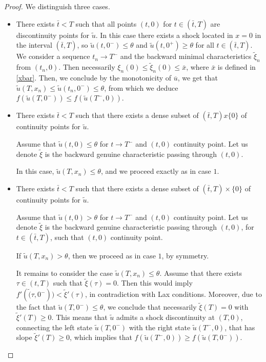 \documentclass[a4paper, 10pt, final]{article}
\begin{document}
\begin{proof}
 
We distinguish three cases.
\begin{itemize}
\item[(i)] There exists $\bar t<T$ such that all points $(t,0)$ for $t\in (\bar t, T)$ 
are discontinuity points for $\widetilde u$. In this case there exists a shock located in $x=0$ in the interval 
$(\bar t, T)$, so $\widetilde u(t, 0^-)\leq \theta$ and $\widetilde u(t, 0^+)\geq \theta$ for all $t\in  (\bar t, T)$. 
We consider a sequence $t_n\to T^-$ and the backward minimal characteristics $\widetilde \xi_n$ from $(t_n, 0)$.  
Then necessarily $\xi_n(0)\leq \widetilde \xi_n(0)\leq \bar x$, where $\bar x$ is defined in \eqref{xbar}. 
Then, we conclude by the monotonicity of $\overline u$, we get that 
$\widetilde u(T,x_n)\leq \widetilde u(t_n, 0^-)\leq \theta$, from which we deduce 
 $ f(\widetilde{u}(T, 0^-))\leq f(\widetilde{u}(T^-, 0))$.
\item[(ii)] There exists $\bar t<T$ such that  there exists a dense subset  of $ (\bar t, T)x\{0\}$ 
of continuity points for $\widetilde u$. 

Assume that  
$\widetilde u(t, 0)\leq \theta$ for $t\to T^-$ and $(t,0) $ continuity point. Let us denote $\widetilde\xi$ is the backward 
genuine characteristic passing through $(t,0)$.

In this case, $\widetilde u(T, x_n)\leq \theta$, and we proceed exactly as in case $1$. 
\item[(iii)] There exists $\bar t<T$ such that  there exists a dense subset  of $ (\bar t, T)\times\{0\}$ 
of continuity points for $\widetilde u$. 

Assume that  
$\widetilde u(t, 0)> \theta$ for $t\to T^-$ and $(t,0) $  continuity point. Let us denote $\widetilde\xi$ 
is the backward genuine characteristic passing through $(t,0)$, for $t\in (\bar t, T)$, such that $(t,0)$ continuity point.

If $\widetilde u(T, x_n)>  \theta$, then we proceed as in case $1$, by symmetry.

It remains to consider the case $\widetilde u(T, x_n)\leq \theta$. Assume that there exists $\tau\in (t, T)$ 
such that $\widetilde \xi(\tau)=0$. Then this would imply $f'(\widetilde(\tau, 0^-))<\widetilde\xi'(\tau)$, 
in contradiction with Lax conditions. Moreover, due to the fact that $\widetilde u(T, 0^-)\leq \theta$, 
we conclude that necessarily $\widetilde \xi(T)=0$ with $\widetilde \xi'(T)\geq 0$. This means that $\widetilde{u}$ 
admits a shock discontinuity
at $(T,0)$, connecting the left state $\widetilde{u}(T, 0^-)$ with the right state $\widetilde{u}(T^-, 0)$,
that has slope $\widetilde \xi'(T)\geq 0$,
which implies that $f(\widetilde{u}(T^-, 0))\geq  f(\widetilde{u}(T, 0^-))$.
\end{itemize}
 

\end{proof}
\end{document}

